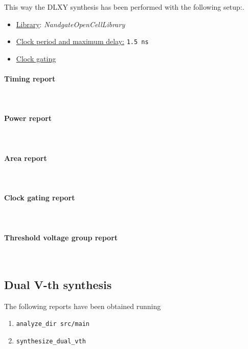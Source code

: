 \bigskip
This way the DLXY synthesis has been performed with the following setup:.
\begin{itemize}
	\item \underline{Library}: \textit{NandgateOpenCellLibrary}
	\item \underline{Clock period and maximum delay:} \texttt{1.5 ns}
	\item \underline{Clock gating}
\end{itemize}

\paragraph{Timing report} \mbox{} \\

\paragraph{Power report} \mbox{} \\

\paragraph{Area report} \mbox{} \\

\paragraph{Clock gating report} \mbox{} \\

\paragraph{Threshold voltage group report} \mbox{} \\


\subsection{Dual V-th synthesis}
The following reports have been obtained running
\begin{enumerate}
	\item \texttt{analyze\_dir src/main}
	\item \texttt{synthesize\_dual\_vth}
\end{enumerate}

